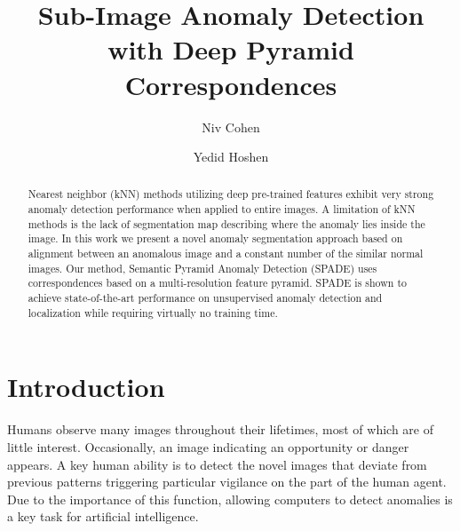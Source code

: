 \documentclass[runningheads]{llncs}
\begin{document}
\pagestyle{headings}
\mainmatter
\def\ECCVSubNumber{2772}  

\title{Sub-Image Anomaly Detection with Deep Pyramid Correspondences} 



\author{Niv Cohen \and Yedid Hoshen}

\maketitle

\begin{abstract}
Nearest neighbor (kNN) methods utilizing deep pre-trained features exhibit very strong anomaly detection performance when applied to entire images. A limitation of kNN methods is the lack of segmentation map describing where the anomaly lies inside the image. In this work we present a novel anomaly segmentation approach based on alignment between an anomalous image and a constant number of the similar normal images. Our method, Semantic Pyramid Anomaly Detection (SPADE) uses correspondences based on a multi-resolution feature pyramid. SPADE is shown to achieve state-of-the-art performance on unsupervised anomaly detection and localization while requiring virtually no training time.
\end{abstract}

\section{Introduction}
\label{sec:intro}

Humans observe many images throughout their lifetimes, most of which are of little interest. Occasionally, an image indicating an opportunity or danger appears. A key human ability is to detect the novel images that deviate from previous patterns triggering particular vigilance on the part of the human agent. Due to the importance of this function, allowing computers to detect anomalies is a key task for artificial intelligence.
\end{document}
